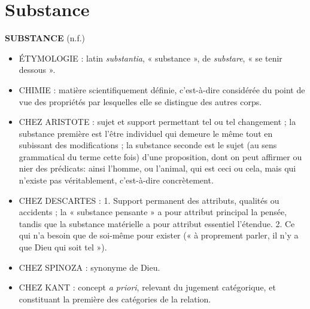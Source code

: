 
\chapter{Substance}

{\bf S{\footnotesize UBSTANCE}} (n.f.)

\begin{itemize}[leftmargin=1cm, label=, itemsep=1pt]
\item {\footnotesize ÉTYMOLOGIE} : latin {\it substantia},
« substance », de {\it substare}, « se tenir
dessous ».
\item {\footnotesize CHIMIE} : matière scientifiquement définie, c'est-à-dire
considérée du point de vue des propriétés par lesquelles elle se distingue des autres corps.
\item {\footnotesize CHEZ ARISTOTE} : sujet et support permettant tel ou tel changement ; la substance première est l'être individuel
qui demeure le même tout en subissant des modifications ; la substance
seconde est le sujet (au sens grammatical du terme cette fois) d’une
proposition, dont on peut affirmer
ou nier des prédicats: ainsi
l'homme, ou l’animal, qui est ceci
ou cela, mais qui n'existe pas véritablement, c’est-à-dire concrètement.
\item {\footnotesize CHEZ DESCARTES} : 1. Support permanent des attributs,
qualités ou accidents ; la « substance
pensante » a pour attribut principal
la pensée, tandis que la substance
matérielle a pour attribut essentiel
l'étendue. 2. Ce qui n’a besoin que
de soi-même pour exister (« à proprement parler, il n’y a que Dieu qui
soit tel »).
\item {\footnotesize CHEZ SPINOZA} : synonyme de Dieu.
\item {\footnotesize CHEZ KANT} : concept {\it a priori}, relevant du jugement catégorique, et constituant la
première des catégories de la relation.
\end{itemize}

